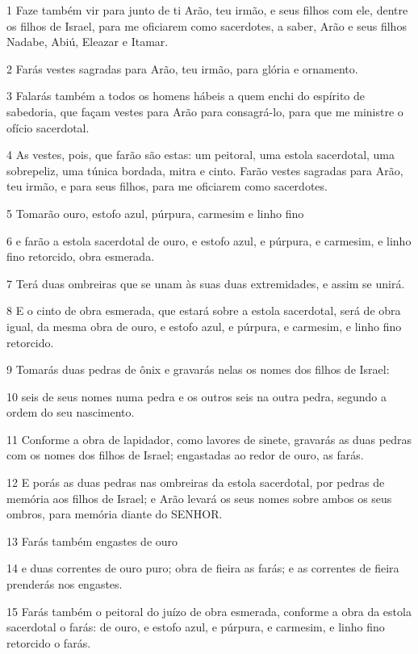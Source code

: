 \par 1 Faze também vir para junto de ti Arão, teu irmão, e seus filhos com ele, dentre os filhos de Israel, para me oficiarem como sacerdotes, a saber, Arão e seus filhos Nadabe, Abiú, Eleazar e Itamar.
\par 2 Farás vestes sagradas para Arão, teu irmão, para glória e ornamento.
\par 3 Falarás também a todos os homens hábeis a quem enchi do espírito de sabedoria, que façam vestes para Arão para consagrá-lo, para que me ministre o ofício sacerdotal.
\par 4 As vestes, pois, que farão são estas: um peitoral, uma estola sacerdotal, uma sobrepeliz, uma túnica bordada, mitra e cinto. Farão vestes sagradas para Arão, teu irmão, e para seus filhos, para me oficiarem como sacerdotes.
\par 5 Tomarão ouro, estofo azul, púrpura, carmesim e linho fino
\par 6 e farão a estola sacerdotal de ouro, e estofo azul, e púrpura, e carmesim, e linho fino retorcido, obra esmerada.
\par 7 Terá duas ombreiras que se unam às suas duas extremidades, e assim se unirá.
\par 8 E o cinto de obra esmerada, que estará sobre a estola sacerdotal, será de obra igual, da mesma obra de ouro, e estofo azul, e púrpura, e carmesim, e linho fino retorcido.
\par 9 Tomarás duas pedras de ônix e gravarás nelas os nomes dos filhos de Israel:
\par 10 seis de seus nomes numa pedra e os outros seis na outra pedra, segundo a ordem do seu nascimento.
\par 11 Conforme a obra de lapidador, como lavores de sinete, gravarás as duas pedras com os nomes dos filhos de Israel; engastadas ao redor de ouro, as farás.
\par 12 E porás as duas pedras nas ombreiras da estola sacerdotal, por pedras de memória aos filhos de Israel; e Arão levará os seus nomes sobre ambos os seus ombros, para memória diante do SENHOR.
\par 13 Farás também engastes de ouro
\par 14 e duas correntes de ouro puro; obra de fieira as farás; e as correntes de fieira prenderás nos engastes.
\par 15 Farás também o peitoral do juízo de obra esmerada, conforme a obra da estola sacerdotal o farás: de ouro, e estofo azul, e púrpura, e carmesim, e linho fino retorcido o farás.
